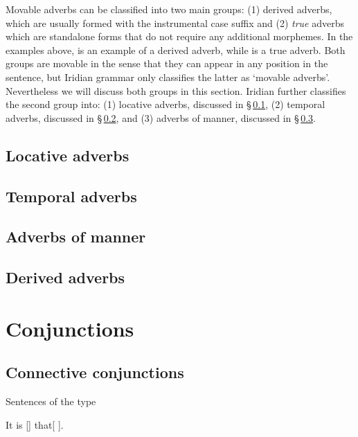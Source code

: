 Movable adverbs can be classified into two main groups: (1) derived adverbs,
which are usually formed with the instrumental case suffix  and (2)
\emph{true} adverbs which are standalone forms that do not require any
additional morphemes. In the examples above,  is an
example of a derived adverb, while  is a true adverb. Both
groups are movable in the sense that they can appear in any position in the
sentence, but Iridian grammar only classifies the latter as `movable adverbs'.
Nevertheless we will discuss both groups in this section. Iridian further
classifies the second group into: (1) locative adverbs, discussed in
\S\,\ref{sec:locative-adverbs}, (2) temporal adverbs, discussed in
\S\,\ref{sec:temporal-adverbs}, and (3) adverbs of manner, discussed in
\S\,\ref{sec:adverbs-of-manner}.

\subsection{Locative adverbs}
\label{sec:locative-adverbs}

\subsection{Temporal adverbs}
\label{sec:temporal-adverbs}

\subsection{Adverbs of manner}
\label{sec:adverbs-of-manner}

\subsection{Derived adverbs}
\label{sec:derived-adverbs}

\section{Conjunctions}
\label{sec:conj}

\subsection{Connective conjunctions}\label{sec:conn-conj}

Sentences of the type

\ex
It is [] that[ ].
\xe

